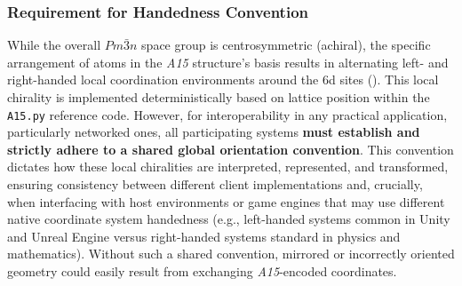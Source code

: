 \documentclass[10pt]{article}
\def\AAAB{\textit{A15}}
\begin{document}
\subsubsection{Requirement for Handedness Convention}\label{subsubsec:limits-handedness}
While the overall $Pm\bar{3}n$ space group is centrosymmetric (achiral), the specific arrangement of atoms in the \AAAB{} structure's basis results in alternating left- and right-handed local coordination environments around the 6d sites (). This local chirality is implemented deterministically based on lattice position within the \texttt{A15.py} reference code. However, for interoperability in any practical application, particularly networked ones, all participating systems \textbf{must establish and strictly adhere to a shared global orientation convention}. This convention dictates how these local chiralities are interpreted, represented, and transformed, ensuring consistency between different client implementations and, crucially, when interfacing with host environments or game engines that may use different native coordinate system handedness (e.g., left-handed systems common in Unity \cite{UnityCoords} and Unreal Engine \cite{UnrealCoords} versus right-handed systems standard in physics and mathematics). Without such a shared convention, mirrored or incorrectly oriented geometry could easily result from exchanging \AAAB{}-encoded coordinates.
\end{document}
